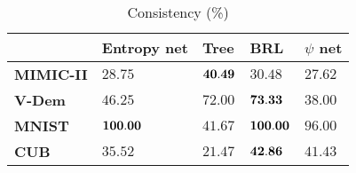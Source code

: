 \documentclass[withindex,glossary]{cam-thesis}
\theoremstyle{plain}
\theoremstyle{definition}
\theoremstyle{remark}
\begin{document}
\begin{table}[t]
\small
\centering
\begin{tabular}{lllll}
\toprule
{} & Entropy net     &              Tree &               BRL &        $\psi$ net\\
\midrule
\textbf{MIMIC-II     } &  $28.75$ &    ${\bf 40.49}$ &   $30.48$ &    $     27.62$ \\
\textbf{V-Dem         }&  $46.25$ &    $72.00$ &   ${\bf 73.33}$ &    $     38.00$ \\
\textbf{MNIST}         &  ${\bf 100.00}$ &   $41.67$ &  ${\bf 100.00}$ &    $96.00$ \\
\textbf{CUB         }  &  $35.52$ &    $21.47$ &   ${\bf 42.86}$ &    $41.43$ \\
\bottomrule
\end{tabular}
\caption{Consistency (\%)}
\label{tab:consistency}
\end{table}


\end{document}

